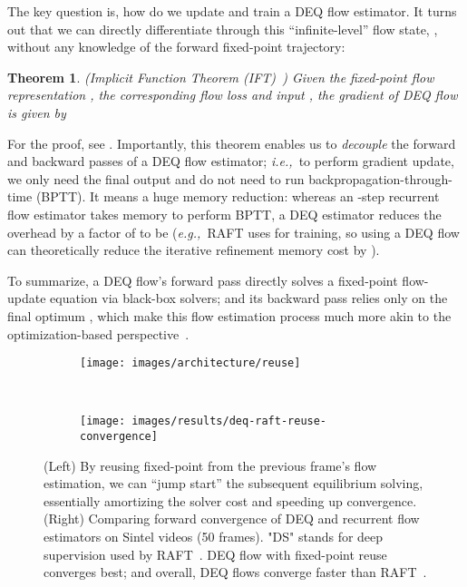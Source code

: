 \documentclass[10pt,twocolumn,letterpaper]{article}
\newtheorem{theorem}{Theorem}
\def\ie{\textit{i.e.,~}}
\def\eg{\textit{e.g.,~}}
\begin{document}
The key question is, how do we update and train a DEQ flow estimator. It turns out that we can directly differentiate through this ``infinite-level'' flow state, , without any knowledge of the forward fixed-point trajectory:
\begin{theorem}
\label{th:ift}
(Implicit Function Theorem (IFT)~\cite{krantz2012implicit,DEQ}) Given the fixed-point flow representation , the corresponding flow loss  and input , the gradient of DEQ flow is given by

\end{theorem}
\noindent For the proof, see \citet{DEQ}. Importantly, this theorem enables us to \emph{decouple} the forward and backward passes of a DEQ flow estimator; \ie to perform gradient update, we only need the final output  and do not need to run backpropagation-through-time (BPTT). It means a huge memory reduction: whereas an -step recurrent flow estimator takes  memory to perform BPTT, a DEQ estimator reduces the overhead by a factor of  to be  (\eg RAFT uses  for training, so using a DEQ flow can theoretically reduce the iterative refinement memory cost by ).

To summarize, a DEQ flow's forward pass directly solves a fixed-point flow-update equation via black-box solvers; and its backward pass relies only on the final optimum , which make this flow estimation process much more akin to the optimization-based perspective~\citep{horn1981determining}.

\begin{figure*}[t]
\centering
  \begin{subfigure}[b]{0.64\textwidth}
  \texttt{[image: images/architecture/reuse]}
  \end{subfigure}
  ~
  \begin{subfigure}[b]{0.34\textwidth}
  \texttt{[image: images/results/deq-raft-reuse-convergence]}
  \end{subfigure}
\vspace{-.2cm}
\caption{(Left) By reusing fixed-point  from the previous frame's flow estimation, we can ``jump start'' the subsequent equilibrium solving, essentially amortizing the solver cost and speeding up convergence. (Right) Comparing forward convergence of DEQ and recurrent flow estimators on Sintel videos (50 frames). "DS" stands for deep supervision used by RAFT~\cite{RAFT}. DEQ flow with fixed-point reuse converges best; and overall, DEQ flows converge faster than RAFT~\cite{RAFT}.}
\label{fig:deq-reuse}
\vspace{-.4cm}
\end{figure*}
\end{document}
